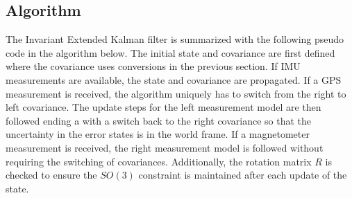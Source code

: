 \subsection{Algorithm}
The Invariant Extended Kalman filter is summarized with the following pseudo code in the algorithm below. The initial state and covariance are first defined where the covariance uses conversions in the previous section. If IMU measurements are available, the state and covariance are propagated. If a GPS measurement is received, the algorithm uniquely has to switch from the right to left covariance. The update steps for the left measurement model are then followed ending a with a switch back to the right covariance so that the uncertainty in the error states is in the world frame. If a magnetometer measurement is received, the right measurement model is followed without requiring the switching of covariances. Additionally, the rotation matrix $R$ is checked to ensure the $SO(3)$ constraint is maintained after each update of the state.

